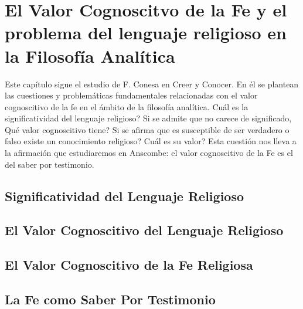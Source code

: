\documentclass[../main.tex]{subfiles}
\begin{document}
\chapter{El Valor Cognoscitvo de la Fe y el problema del lenguaje religioso en la Filosofía Analítica}



Este capítulo sigue el estudio de F. Conesa en Creer y Conocer. En él se plantean las cuestiones y problemáticas fundamentales relacionadas con el valor cognoscitivo de la fe en el ámbito de la filosofía analítica.  \textquestiondown{}Cuál es la significatividad del lenguaje religioso? Si se admite que no carece de significado, \textquestiondown{}Qué valor cognoscitivo tiene? Si se afirma que es susceptible de ser verdadero o falso \textquestiondown{}existe un conocimiento religioso? \textquestiondown{}Cuál es su valor? Esta cuestión nos lleva a la afirmación que estudiaremos en Anscombe: el valor cognoscitivo de la Fe es el del saber por testimonio.


\section{Significatividad del Lenguaje Religioso}

\section{El Valor Cognoscitivo del Lenguaje Religioso}

\section{El Valor Cognoscitivo de la Fe Religiosa}

\section{La Fe como Saber Por Testimonio}
\end{document}
